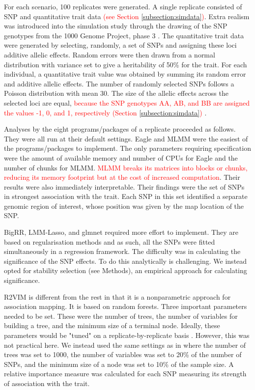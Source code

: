 \documentclass{bioinfo}
\begin{document}
For each scenario, 100 replicates were generated. A single replicate consisted of SNP and quantitative trait data \textcolor{red}{(see Section 
\ref{subsection:simdata})}. 
Extra realism was introduced into the simulation study through the drawing of the SNP genotypes from the 1000 Genome Project, phase 3  \citep{10002010map}.
 The quantitative trait data were generated 
by selecting, randomly, a set of SNPs and assigning these loci additive allelic effects.  Random errors were then drawn from a normal distribution 
with variance set to give a heritability of 50\% for the trait. 
For each individual, a quantitative trait value was obtained by summing its random error and additive allelic effects. 
The number of randomly selected SNPs follows a Poisson distribution with mean 30. The size of the allelic effects 
 across the selected loci are equal, \textcolor{red}{because the SNP genotypes AA, AB, and BB 
are assigned the values -1, 0, and 1, respectively (Section \ref{subsection:simdata})} . 
 
  
 
 Analyses by the eight programs/packages of a replicate proceeded as follows. They were all run at their default settings. 
 Eagle and MLMM were the easiest of the programs/packages to implement. 
 The only parameters requiring specification were the amount of available memory and number of CPUs for 
 Eagle and the number of chunks for MLMM.  \textcolor{red}{MLMM breaks its matrices into blocks or chunks, 
 reducing its memory 
 footprint but at the cost of increased computation}.  Their results were also immediately 
 interpretable. Their findings were the set of SNPs in strongest association with the trait. Each 
SNP in this set identified a separate genomic region of interest, whose position was given by the map location of the SNP.  

BigRR, LMM-Lasso, and glmnet required more effort to implement. They are based on regularisation methods and as such, all the SNPs were fitted simultaneously in a regression 
framework. The difficulty was in calculating the significance of the SNP effects. To do this analytically is challenging. We instead opted for stability selection (see Methods),  
an empirical approach for calculating significance. 

R2VIM is different from the rest in that it is a nonparametric approach for association mapping. It is based on random forests. Three important parameters needed to be  set. 
These were the number of trees, the number of variables for building a tree, and the minimum size of a terminal node. Ideally, these parameters would be "tuned" on a replicate-by-replicate 
basis \citep{boulesteix2012overview}. However, this was not practical here. We instead used the same settings as in \citep{szymczak2016r2vim} where 
the number of trees was set to 1000, the number of variables was set to 20\% of the number of SNPs, and 
  the minimum size of a node was set to 10\% of the sample size.
A relative importance measure was calculated 
for each SNP measuring its strength of association with the trait.
\end{document}
